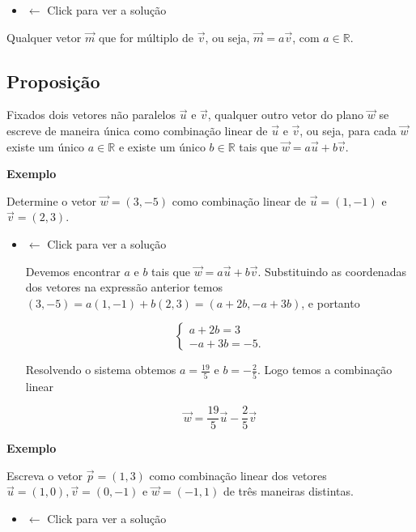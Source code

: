 \documentclass[
  brazilian,
  letterpaper,
  DIV=11,
  numbers=noendperiod]{scrreprt}
\providecommand{\tightlist}{%
  \setlength{\itemsep}{0pt}\setlength{\parskip}{0pt}}
\theoremstyle{definition}
\theoremstyle{plain}
\theoremstyle{definition}
\theoremstyle{remark}
\begin{document}
\begin{itemize}
\tightlist
\item
  \(\leftarrow\) Click para ver a solução
\end{itemize}

Qualquer vetor \(\vec{m}\) que for múltiplo de \(\vec{v}\), ou seja,
\(\vec{m} = a \vec{v}\), com \(a \in \mathbb{R}\).

\subsection{Proposição}\label{proposiuxe7uxe3o-7}

Fixados dois vetores não paralelos \(\vec{u}\) e \(\vec{v}\), qualquer
outro vetor do plano \(\vec{w}\) se escreve de maneira única como
combinação linear de \(\vec{u}\) e \(\vec{v}\), ou seja, para cada
\(\vec{w}\) existe um único \(a\in \mathbb{R}\) e existe um único
\(b\in \mathbb{R}\) tais que \(\vec{w}=a\vec{u}+b\vec{v}.\)

\textbf{Exemplo}

Determine o vetor \(\vec{w}=(3,-5)\) como combinação linear de
\(\vec{u}=(1,-1)\) e \(\vec{v}=(2,3)\).

\begin{itemize}
\item
  \(\leftarrow\) Click para ver a solução

  Devemos encontrar \(a\) e \(b\) tais que
  \(\vec{w}=a\vec{u}+b\vec{v}.\) Substituindo as coordenadas dos vetores
  na expressão anterior temos \((3,-5)=a(1,-1)+b(2,3)=(a+2b,-a+3b)\), e
  portanto

  \[
    \left\{ \begin{array}{l} a +2b = 3 \\ -a + 3b = -5. \end{array} \right.
    \]

  Resolvendo o sistema obtemos \(a=\frac{19}{5}\) e \(b=-\frac{2}{5}\).
  Logo temos a combinação linear

  \[
    \vec{w}=\frac{19}{5}\vec{u}-\frac{2}{5}\vec{v}
    \]
\end{itemize}

\textbf{Exemplo}

Escreva o vetor \(\vec{p}=(1,3)\) como combinação linear dos vetores
\(\vec{u}=(1,0),\vec{v}=(0,-1)\) e \(\vec{w}=(-1,1)\) de três maneiras
distintas.

\begin{itemize}
\tightlist
\item
  \(\leftarrow\) Click para ver a solução
\end{itemize}
\end{document}
